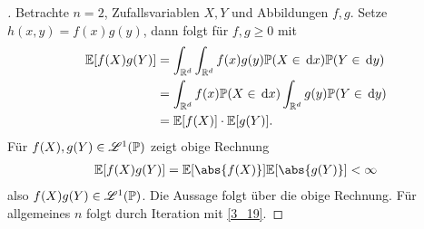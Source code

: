 \begin{proof}[]
	Betrachte $n=2$, Zufallsvariablen $X,Y$ und Abbildungen $f,g$. Setze $h(x,y) = f(x)g(y)$, dann folgt für $f,g \ge 0$ mit 
	\begin{align*}
		\mathbb{E}[f(X)g(Y)] &= \int_{\mathbb{R}^d} \int_{\mathbb{R}^d} f(x)g(y)\mathbb{P}(X\in \,\mathrm{d} x)\mathbb{P}(Y\in \,\mathrm{d} y)\\
		&= \int_{\mathbb{R}^d} f(x)\mathbb{P}(X \in \,\mathrm{d} x)\int_{\mathbb{R}^d} g(y)\mathbb{P}(Y \in \,\mathrm{d} y)\\
		&= \mathbb{E}[f(X)]\cdot \mathbb{E}[g(Y)].
	\end{align*}
	Für $f(X),g(Y) \in \mathscr{L}^{1}(\mathbb{P})$ zeigt obige Rechnung
	\begin{align*}
		\E[f(X)g(Y)] = \E[\abs{f(X)}]\E[\abs{g(Y)}] < \infty
	\end{align*}
	also $f(X)g(Y) \in \mathscr{L}^{1}(\mathbb{P})$. Die Aussage folgt über die obige Rechnung. Für allgemeines $n$ folgt  durch Iteration mit \cref{3_19}.
\end{proof}
